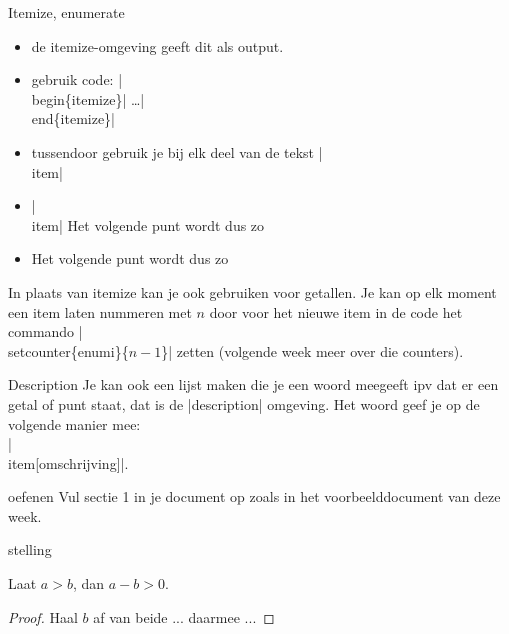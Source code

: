 \documentclass{cursuspresentatie}
\begin{document}
\begin{frame}{Itemize, enumerate}
	\begin{itemize}
		\item de itemize-omgeving geeft dit als output.
		\item gebruik code: \hll|\\begin\{itemize\}| \dots \hll|\\end\{itemize\}|
		\item tussendoor gebruik je bij elk deel van de tekst \hll|\\item|
		\item \hll|\\item| Het volgende punt wordt dus zo
		\item Het volgende punt wordt dus zo
	\end{itemize}
In plaats van itemize kan je ook  gebruiken voor getallen. Je kan
op elk moment een item laten nummeren met $n$ door voor het nieuwe item in de
code het commando \hll|\\setcounter\{enumi\}\{$n-1$\}| zetten
(volgende week meer over die counters).
\end{frame}

\begin{frame}{Description}
	Je kan ook een lijst maken die je een woord meegeeft ipv dat er een getal of
	punt staat, dat is de \hll|description| omgeving. Het woord geef je op de
	volgende manier mee:\\
	\hll|\\item[omschrijving]|.
\end{frame}

\begin{frame}{oefenen}
	Vul sectie 1 in je document op zoals in het voorbeelddocument van deze week.
\end{frame}

\begin{saveblock}{stelling}
    \begin{highlightblock}
        \begin{stelling}
            Laat $ a > b $, dan $ a - b > 0 $.
            \begin{proof}
                Haal $ b $ af van beide ...
                daarmee ...
            \end{proof}
        \end{stelling}
    \end{highlightblock}
\end{saveblock}
\end{document}
